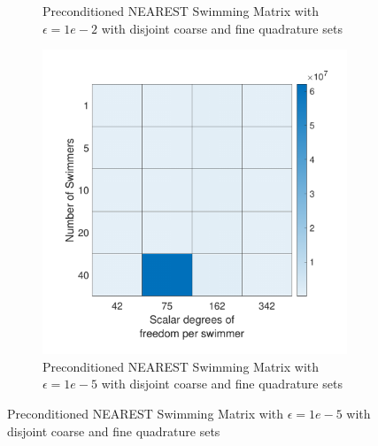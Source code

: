 \begin{figure}
\begin{subfigure}{0.3\textwidth}
        \caption{Preconditioned NEAREST Swimming Matrix with $\epsilon=1e-2$ with disjoint coarse and fine quadrature sets}  
    \end{subfigure}
    \begin{subfigure}{0.3\textwidth}
        \includegraphics[width=\linewidth]{Images/Condition/Mobility Matrix using Disjoint NEAREST Preconditioned-5.pdf}
        \caption{Preconditioned NEAREST Swimming Matrix with $\epsilon=1e-5$ with disjoint coarse and fine quadrature sets}  
    \end{subfigure}
\end{figure}

